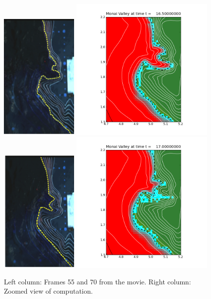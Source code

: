 \begin{figure}[ht]
\hfil\includegraphics[width=1.5in]{bp7/movie/Frame55.png}\hfil
\hfil\includegraphics[width=2.8in]{bp7/figs423/frame0011fig10.png}\hfil
\vskip 5pt
\hfil\includegraphics[width=1.5in]{bp7/movie/Frame70.png}\hfil
\hfil\includegraphics[width=2.8in]{bp7/figs423/frame0013fig10.png}\hfil
\vskip 5pt
\caption{\label{fig:bp7framesB} 
Left column: Frames 55 and 70 from the movie.
Right column: Zoomed view of computation.
  }
\end{figure}

